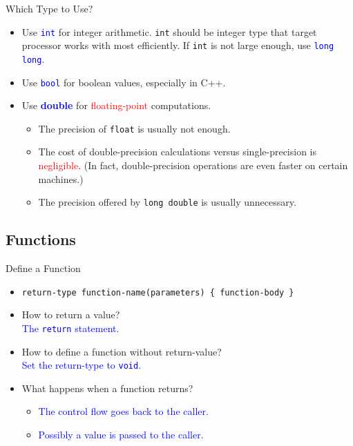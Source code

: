 \documentclass{beamer}
\newcommand{\red}[1]{\textcolor{red}{#1}}
\newcommand{\blue}[1]{\textcolor{blue}{#1}}
\begin{document}
\begin{frame}{Which Type to Use?}
    \begin{itemize}
        \item Use \blue{\texttt{int}} for integer arithmetic. \texttt{int} should be integer type that target processor works with most efficiently. If \texttt{int} is not large enough, use \blue{\texttt{long long}}.
        \item Use \blue{\texttt{bool}} for boolean values, especially in C++.
        \item Use \blue{\textbf{double}} for \red{floating-point} computations.
        \pause
        \begin{itemize}
            \item The precision of \texttt{float} is usually not enough.
            \item The cost of double-precision calculations versus single-precision is \red{negligible}. (In fact, double-precision operations are even faster on certain machines.)
            \item The precision offered by \texttt{long double} is usually unnecessary.
        \end{itemize}
    \end{itemize}
\end{frame}

\subsection{Functions}

\begin{frame}{Define a Function}
    \begin{itemize}
        \item \texttt{return-type function-name(parameters) \{ function-body \}}
        \item How to return a value?\\
        \pause
        \blue{The \texttt{return} statement.}
        \pause
        \item How to define a function without return-value?\\
        \pause
        \blue{Set the return-type to \texttt{void}.}
        \pause
        \item What happens when a function returns?
        \pause
        \begin{itemize}
            \item \blue{The control flow goes back to the caller.}
            \item \blue{Possibly a value is passed to the caller.}
        \end{itemize}
    \end{itemize}
\end{frame}
\end{document}
